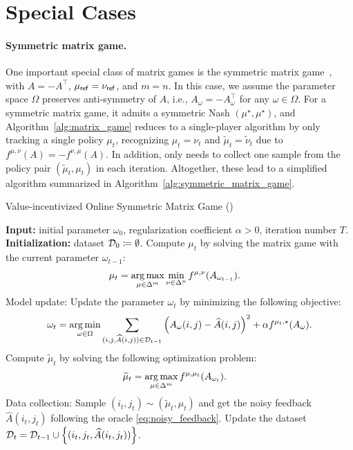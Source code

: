 

\section{Special Cases}

\paragraph{Symmetric matrix game.}  One important special class of matrix games is the symmetric matrix game~\citep{cheng2004notes}, with $A=-A^\top$, $\mu_{\mathsf{ref}}=\nu_{\mathsf{ref}}$, and $m=n$. In this case, we assume the parameter space $\Omega$ preserves anti-symmetry of $A$, i.e., $A_{\omega}  = -A_{\omega}^{\top}$ for any $\omega \in \Omega$. For a symmetric matrix game, it admits a symmetric Nash $(\mu^\star,\mu^\star)$, and Algorithm~\ref{alg:matrix_game}  reduces to a single-player algorithm by only tracking a single policy $\mu_t$, recognizing $\mu_t=\nu_t$ and $\widetilde{\mu}_t= \widetilde{\nu}_t$ due to $f^{\mu,\nu}(A)=-f^{\nu,\mu}(A)$. In addition,  \name only needs to collect one sample from the policy pair $(\widetilde{\mu}_t,\mu_t)$ in each iteration. Altogether, these lead to a simplified algorithm summarized in Algorithm~\ref{alg:symmetric_matrix_game}.

  

 
\begin{algorithm}[th]
    \caption{Value-incentivized Online Symmetric Matrix Game (\name)}
    \label{alg:symmetric_matrix_game}
    \begin{algorithmic}[1]
    \STATE \textbf{Input:}  initial parameter $\omega_0$, regularization coefficient $\alpha>0$, iteration number $T$.  
    \STATE \textbf{Initialization:} dataset ${\mathcal{D}}_0\coloneqq \emptyset$.
    \STATE 
    Compute $\mu_t$ by solving the matrix game with the current parameter $\omega_{t-1}$:
    \begin{align}%
        \mu_t&=\argmax_{\mu\in\Delta^m}\min_{\nu\in\Delta^n} f^{\mu,\nu}(A_{\omega_{t-1}}) .
    \end{align}
    \STATE Model update: Update the parameter $\omega_t$ by minimizing the following objective:
    \begin{align}%
        \omega_t=\argmin_{\omega\in\Omega}\sum_{(i,j,\widehat{A}(i,j))\in\gD_{t-1}}\left(A_\omega(i,j)-\widehat{A}(i,j)\right)^2+\alpha f^{\mu_t,\star}(A_{\omega}).
    \end{align}
    \STATE Compute $\widetilde{\mu}_t$  by solving the following optimization problem:
    \begin{align}%
        \widetilde{\mu}_t& = \argmax_{\mu\in\Delta^m} f^{\mu,\mu_t}(A_{\omega_t}) .
    \end{align}
    \STATE Data collection: Sample $(i_t,j_t)\sim (\widetilde{\mu}_t,\mu_t)$  and get the noisy feedback $\widehat{A}(i_t,j_t)$ following the oracle \eqref{eq:noisy_feedback}. Update the dataset ${{\mathcal{D}}}_t={\mathcal{D}}_{t-1}\cup\left\{ (i_t,j_t,\widehat{A}(i_t,j_t) ) \right\}$.
    \ENDFOR 
    \end{algorithmic}
\end{algorithm}


